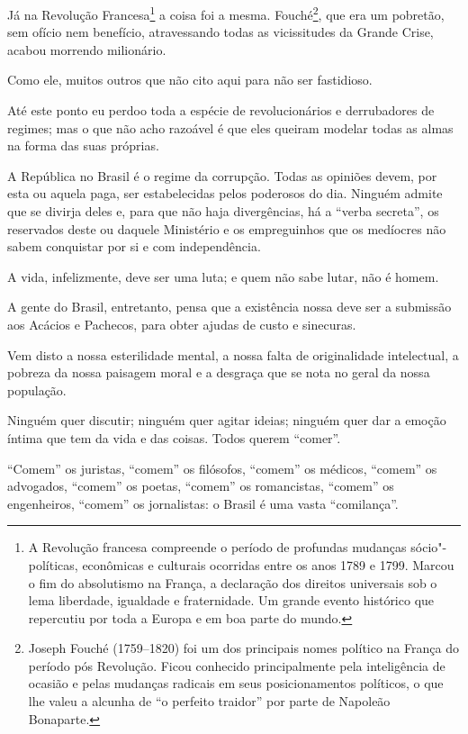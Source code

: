 Já na Revolução Francesa\footnote{A Revolução francesa compreende o
  período de profundas mudanças sócio"-políticas, econômicas e culturais
  ocorridas entre os anos 1789 e 1799. Marcou o fim do absolutismo na
  França, a declaração dos direitos universais sob o lema liberdade,
  igualdade e fraternidade. Um grande evento histórico que repercutiu
  por toda a Europa e em boa parte do mundo.} a coisa foi a mesma.
Fouché\footnote{Joseph Fouché (1759--1820) foi um dos principais nomes
  político na França do período pós Revolução. Ficou conhecido
  principalmente pela inteligência de ocasião e pelas mudanças radicais
  em seus posicionamentos políticos, o que lhe valeu a alcunha de ``o
  perfeito traidor'' por parte de Napoleão Bonaparte.}, que era um
pobretão, sem ofício nem benefício, atravessando todas as vicissitudes
da Grande Crise, acabou morrendo milionário.

Como ele, muitos outros que não cito aqui para não ser fastidioso.

Até este ponto eu perdoo toda a espécie de revolucionários e
derrubadores de regimes; mas o que não acho razoável é que eles queiram
modelar todas as almas na forma das suas próprias.

A República no Brasil é o regime da corrupção. Todas as opiniões devem,
por esta ou aquela paga, ser estabelecidas pelos poderosos do dia.
Ninguém admite que se divirja deles e, para que não haja divergências,
há a ``verba secreta'', os reservados deste ou daquele Ministério e os
empreguinhos que os medíocres não sabem conquistar por si e com
independência.

A vida, infelizmente, deve ser uma luta; e quem não sabe lutar, não é
homem.

A gente do Brasil, entretanto, pensa que a existência nossa deve ser a
submissão aos Acácios e Pachecos, para obter ajudas de custo e
sinecuras.

Vem disto a nossa esterilidade mental, a nossa falta de originalidade
intelectual, a pobreza da nossa paisagem moral e a desgraça que se nota
no geral da nossa população.

Ninguém quer discutir; ninguém quer agitar ideias; ninguém quer dar a
emoção íntima que tem da vida e das coisas. Todos querem ``comer''.

``Comem'' os juristas, ``comem'' os filósofos, ``comem'' os médicos,
``comem'' os advogados, ``comem'' os poetas, ``comem'' os romancistas,
``comem'' os engenheiros, ``comem'' os jornalistas: o Brasil é uma vasta
``comilança''.

